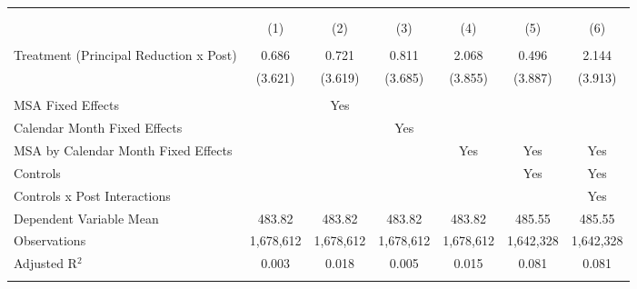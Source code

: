 
\begin{tabular}{@{\extracolsep{5pt}}lcccccc} 
\\[-1.8ex]\hline 
\hline \\[-1.8ex] 
\\[-1.8ex] & (1) & (2) & (3) & (4) & (5) & (6)\\ 
\hline \\[-1.8ex] 
 Treatment (Principal Reduction x Post) & 0.686 & 0.721 & 0.811 & 2.068 & 0.496 & 2.144 \\ 
  & (3.621) & (3.619) & (3.685) & (3.855) & (3.887) & (3.913) \\ 
 \hline \\[-1.8ex] 
MSA Fixed Effects &  & Yes &  &  &  &  \\ 
Calendar Month Fixed Effects &  &  & Yes &  &  &  \\ 
MSA by Calendar Month Fixed Effects &  &  &  & Yes & Yes & Yes \\ 
Controls &  &  &  &  & Yes & Yes \\ 
Controls x Post Interactions &  &  &  &  &  & Yes \\ 
Dependent Variable Mean & 483.82 & 483.82 & 483.82 & 483.82 & 485.55 & 485.55 \\ 
Observations & 1,678,612 & 1,678,612 & 1,678,612 & 1,678,612 & 1,642,328 & 1,642,328 \\ 
Adjusted R$^{2}$ & 0.003 & 0.018 & 0.005 & 0.015 & 0.081 & 0.081 \\ 
\hline 
\hline \\[-1.8ex] 
\end{tabular} 
